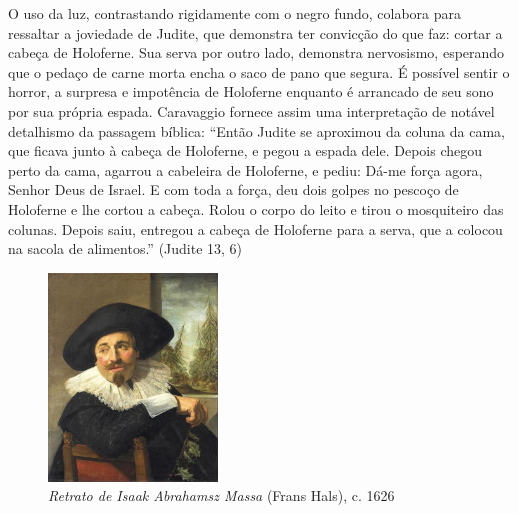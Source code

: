 O uso da luz, contrastando rigidamente com o negro fundo, colabora
para ressaltar a joviedade de Judite, que demonstra ter convicção do
que faz: cortar a cabeça de Holoferne. Sua serva por outro lado,
demonstra nervosismo, esperando que o pedaço de carne morta encha o
saco de pano que segura. É possível sentir o horror, a surpresa e
impotência de Holoferne enquanto é arrancado de seu sono por sua
própria espada. Caravaggio fornece assim uma interpretação de notável
detalhismo da passagem bíblica: ``Então Judite se aproximou da coluna
da cama, que ficava junto à cabeça de Holoferne, e pegou a espada
dele. Depois chegou perto da cama, agarrou a cabeleira de Holoferne, e
pediu: Dá-me força agora, Senhor Deus de Israel. E com toda a força,
deu dois golpes no pescoço de Holoferne e lhe cortou a cabeça. Rolou o
corpo do leito e tirou o mosquiteiro das colunas. Depois saiu,
entregou a cabeça de Holoferne para a serva, que a colocou na sacola
de alimentos.'' (Judite 13, 6)

\begin{figure}
  \begin{center}
    \includegraphics[width=0.4\textwidth]{figs/hals_massa.png}
  \end{center}
  \caption{\emph{Retrato de Isaak Abrahamsz Massa} (Frans Hals), c. 1626}
  \label{fig:hals:massa}
\end{figure}


